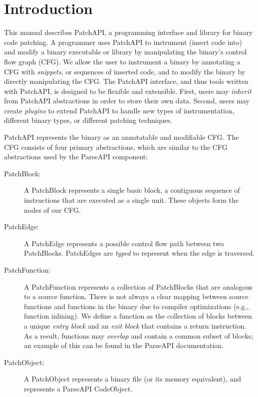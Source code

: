 \section{Introduction}
\label{sec-1}

This manual describes PatchAPI, a programming interface and library
for binary code patching. A programmer uses PatchAPI to instrument
(insert code into) and modify a binary executable or library by
manipulating the binary's control flow graph (CFG). We allow the user
to instrument a binary by annotating a CFG with \emph{snippets}, or
sequences of inserted code, and to modify the binary by directly
manipulating the CFG. The PatchAPI interface, and thus tools written
with PatchAPI, is designed to be flexible and extensible. First, users
may \emph{inherit} from PatchAPI abstractions in order to store their
own data. Second, users may create \emph{plugins} to extend PatchAPI
to handle new types of instrumentation, different binary types, or
different patching techniques. 

PatchAPI represents the binary as an annotatable and modifiable
CFG. The CFG consists of four primary abstractions, which are similar
to the CFG abstractions used by the ParseAPI component:
\begin{description}
\item[PatchBlock:] A PatchBlock represents a single basic block, a
  contiguous sequence of instructions that are executed as a single
  unit. These objects form the nodes of our CFG. 
\item[PatchEdge:] A PatchEdge represents a possible control flow path
  between two PatchBlocks. PatchEdges are \emph{typed} to represent
  when the edge is traversed. 
\item[PatchFunction:] A PatchFunction represents a collection of
  PatchBlocks that are analogous to a source function. There is not
  always a clear mapping between source functions and functions in the
  binary due to compiler optimizations (e.g., function inlining). We
  define a function as the collection of blocks between a unique
  \emph{entry block} and an \emph{exit block} that contains a return
  instruction. As a result, functions may \emph{overlap} and contain
  a common subset of blocks; an example of this can be found in the
  ParseAPI documentation.
\item[PatchObject:] A PatchObject represents a binary file (or its
  memory equivalent), and represents a ParseAPI CodeObject.
\end{description}

